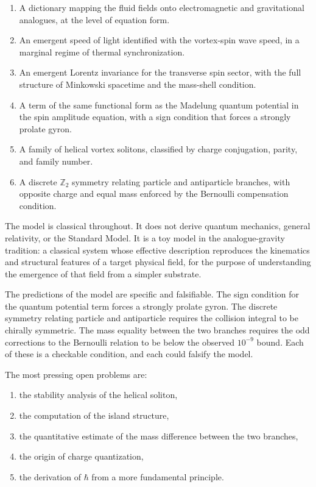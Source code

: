 \documentclass[11pt]{article}
\numberwithin{equation}{section}
\begin{document}
\begin{enumerate}
	\item A dictionary mapping the fluid fields onto electromagnetic
	and gravitational analogues, at the level of equation form.
	
	\item An emergent speed of light identified with the vortex-spin
	wave speed, in a marginal regime of thermal synchronization.
	
	\item An emergent Lorentz invariance for the transverse spin
	sector, with the full structure of Minkowski spacetime and the
	mass-shell condition.
	
	\item A term of the same functional form as the Madelung quantum
	potential in the spin amplitude equation, with a sign condition
	that forces a strongly prolate gyron.
	
	\item A family of helical vortex solitons, classified by charge
	conjugation, parity, and family number.
	
	\item A discrete $\mathbb{Z}_2$ symmetry relating particle and
	antiparticle branches, with opposite charge and equal mass
	enforced by the Bernoulli compensation condition.
\end{enumerate}

The model is classical throughout. It does not derive quantum
mechanics, general relativity, or the Standard Model. It is a toy
model in the analogue-gravity tradition: a classical system whose
effective description reproduces the kinematics and structural features
of a target physical field, for the purpose of understanding the
emergence of that field from a simpler substrate.

The predictions of the model are specific and falsifiable. The sign
condition for the quantum potential term forces a strongly prolate
gyron. The discrete symmetry relating particle and antiparticle
requires the collision integral to be chirally symmetric. The mass
equality between the two branches requires the odd corrections to the
Bernoulli relation to be below the observed $10^{-9}$ bound. Each of
these is a checkable condition, and each could falsify the model.

The most pressing open problems are:

\begin{enumerate}
	\item the stability analysis of the helical soliton,
	\item the computation of the island structure,
	\item the quantitative estimate of the mass difference between
	the two branches,
	\item the origin of charge quantization,
	\item the derivation of $\hbar$ from a more fundamental principle.
\end{enumerate}
\end{document}
